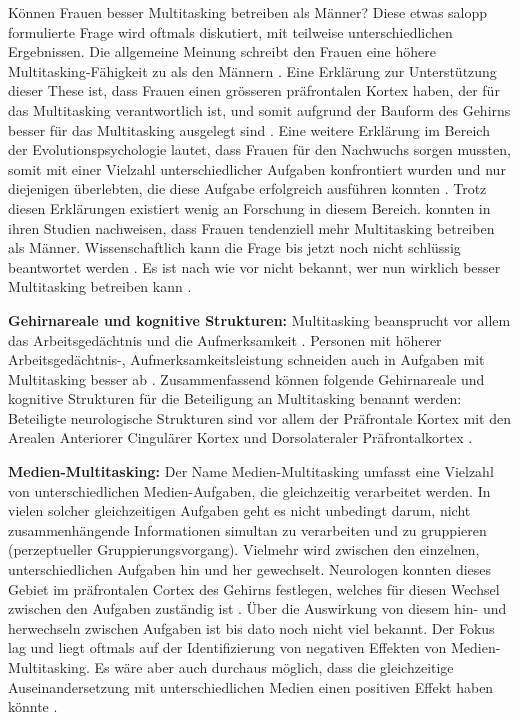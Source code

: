 Können Frauen besser Multitasking betreiben als Männer? Diese etwas salopp formulierte Frage wird oftmals diskutiert, mit teilweise unterschiedlichen Ergebnissen. Die allgemeine Meinung schreibt den Frauen eine höhere Multitasking-Fähigkeit zu als den Männern \cite{Oconnell2002}. Eine Erklärung zur Unterstützung dieser These ist, dass Frauen einen grösseren präfrontalen Kortex haben, der für das Multitasking verantwortlich ist, und somit aufgrund der Bauform des Gehirns besser für das Multitasking ausgelegt sind \cite{Fisher2000}. Eine weitere Erklärung im Bereich der Evolutionspsychologie lautet, dass Frauen für den Nachwuchs sorgen mussten, somit mit einer Vielzahl unterschiedlicher Aufgaben konfrontiert wurden und nur diejenigen überlebten, die diese Aufgabe erfolgreich ausführen konnten \cite{Ellison2006}. Trotz diesen Erklärungen existiert wenig an Forschung in diesem Bereich.  konnten in ihren Studien nachweisen, dass Frauen tendenziell mehr Multitasking betreiben als Männer. Wissenschaftlich kann die Frage bis jetzt noch nicht schlüssig beantwortet werden \cite{Foehr2006}. Es ist nach wie vor nicht bekannt, wer nun wirklich besser Multitasking betreiben kann \cite{Mahany2005, Klingberg2008}. 
\par  
\textbf{Gehirnareale und kognitive Strukturen:} Multitasking beansprucht vor allem das Arbeitsgedächtnis und die Aufmerksamkeit \cite{Baethge2013}. Personen mit höherer Arbeitsgedächtnis-, Aufmerksamkeitsleistung schneiden auch in Aufgaben mit Multitasking besser ab \cite{Buhner2006}. Zusammenfassend können folgende Gehirnareale und kognitive Strukturen für die Beteiligung an Multitasking benannt werden: Beteiligte neurologische Strukturen sind vor allem der Präfrontale Kortex mit den Arealen Anteriorer Cingulärer Kortex und Dorsolateraler Präfrontalkortex \cite{Dreher2003}.
\par
\textbf{Medien-Multitasking:} Der Name Medien-Multitasking umfasst eine Vielzahl von unterschiedlichen Medien-Aufgaben, die gleichzeitig verarbeitet werden. In vielen solcher gleichzeitigen Aufgaben geht es nicht unbedingt darum, nicht zusammenhängende Informationen simultan zu verarbeiten und zu gruppieren (perzeptueller Gruppierungsvorgang). Vielmehr wird zwischen den einzelnen, unterschiedlichen Aufgaben hin und her gewechselt. Neurologen konnten dieses Gebiet im präfrontalen Cortex des Gehirns festlegen, welches für diesen Wechsel zwischen den Aufgaben zuständig ist \cite{Wallis2006, Wood2003}. Über die Auswirkung von diesem hin- und herwechseln zwischen Aufgaben ist bis dato noch nicht viel bekannt. Der Fokus lag und liegt oftmals auf der Identifizierung von negativen Effekten von Medien-Multitasking. Es wäre aber auch durchaus möglich, dass die gleichzeitige Auseinandersetzung mit unterschiedlichen Medien einen positiven Effekt haben könnte \cite{Foehr2006}.   

